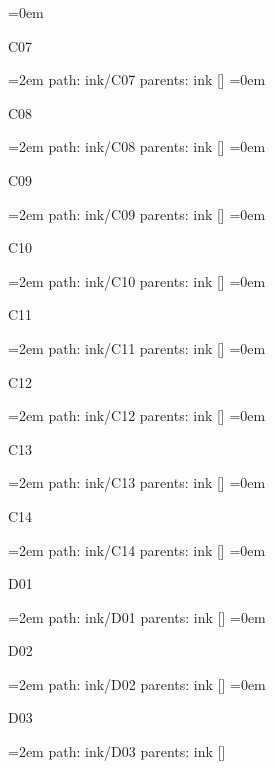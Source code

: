 \smallskip
\leftskip=0em
\par\endgroup
\bigskip
{}
C07
\smallskip
\par\begingroup
\leftskip=2em
path: ink/C07
\smallskip
parents:  ink []
\smallskip
\leftskip=0em
\par\endgroup
\bigskip
{}
C08
\smallskip
\par\begingroup
\leftskip=2em
path: ink/C08
\smallskip
parents:  ink []
\smallskip
\leftskip=0em
\par\endgroup
\bigskip
{}
C09
\smallskip
\par\begingroup
\leftskip=2em
path: ink/C09
\smallskip
parents:  ink []
\smallskip
\leftskip=0em
\par\endgroup
\bigskip
{}
C10
\smallskip
\par\begingroup
\leftskip=2em
path: ink/C10
\smallskip
parents:  ink []
\smallskip
\leftskip=0em
\par\endgroup
\bigskip
{}
C11
\smallskip
\par\begingroup
\leftskip=2em
path: ink/C11
\smallskip
parents:  ink []
\smallskip
\leftskip=0em
\par\endgroup
\bigskip
{}
C12
\smallskip
\par\begingroup
\leftskip=2em
path: ink/C12
\smallskip
parents:  ink []
\smallskip
\leftskip=0em
\par\endgroup
\bigskip
{}
C13
\smallskip
\par\begingroup
\leftskip=2em
path: ink/C13
\smallskip
parents:  ink []
\smallskip
\leftskip=0em
\par\endgroup
\bigskip
{}
C14
\smallskip
\par\begingroup
\leftskip=2em
path: ink/C14
\smallskip
parents:  ink []
\smallskip
\leftskip=0em
\par\endgroup
\bigskip
{}
D01
\smallskip
\par\begingroup
\leftskip=2em
path: ink/D01
\smallskip
parents:  ink []
\smallskip
\leftskip=0em
\par\endgroup
\bigskip
{}
D02
\smallskip
\par\begingroup
\leftskip=2em
path: ink/D02
\smallskip
parents:  ink []
\smallskip
\leftskip=0em
\par\endgroup
\bigskip
{}
D03
\smallskip
\par\begingroup
\leftskip=2em
path: ink/D03
\smallskip
parents:  ink []
